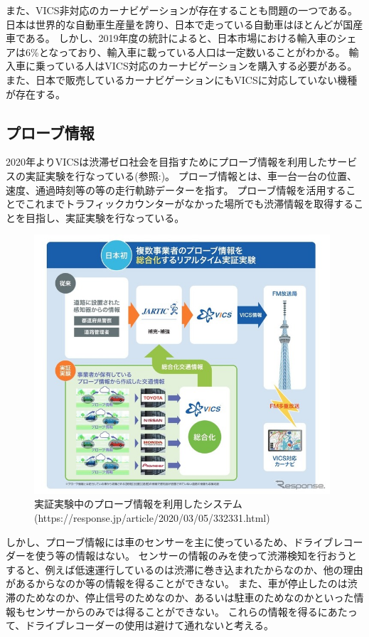 また、VICS非対応のカーナビゲーションが存在することも問題の一つである。
日本は世界的な自動車生産量を誇り、日本で走っている自動車はほとんどが国産車である。
しかし、2019年度の統計によると、日本市場における輸入車のシェアは6\%となっており、輸入車に載っている人口は一定数いることがわかる。
輸入車に乗っている人はVICS対応のカーナビゲーションを購入する必要がある。
また、日本で販売しているカーナビゲーションにもVICSに対応していない機種が存在する。

\subsection{プローブ情報}
2020年よりVICSは渋滞ゼロ社会を目指すためにプローブ情報を利用したサービスの実証実験を行なっている(参照:)。
プローブ情報とは、車一台一台の位置、速度、通過時刻等の等の走行軌跡データーを指す。
プローブ情報を活用することでこれまでトラフィックカウンターがなかった場所でも渋滞情報を取得することを目指し、実証実験を行なっている。

\begin{figure}[htbp]
  \begin{center}
   \includegraphics[width=11cm]{figs/probe.jpg}
  \end{center}
  \caption{実証実験中のプローブ情報を利用したシステム(https://response.jp/article/2020/03/05/332331.html)}
  \label{fig:probe}
\end{figure}

しかし、プローブ情報には車のセンサーを主に使っているため、ドライブレコーダーを使う等の情報はない。
センサーの情報のみを使って渋滞検知を行おうとすると、例えば低速運行しているのは渋滞に巻き込まれたからなのか、他の理由があるからなのか等の情報を得ることができない。
また、車が停止したのは渋滞のためなのか、停止信号のためなのか、あるいは駐車のためなのかといった情報もセンサーからのみでは得ることができない。
これらの情報を得るにあたって、ドライブレコーダーの使用は避けて通れないと考える。

